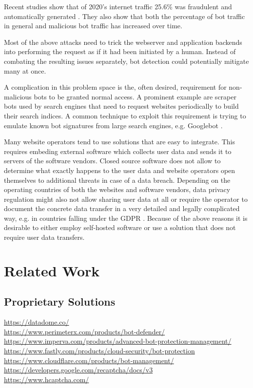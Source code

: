 \documentclass[
    fontsize=12pt,
    headings=small,
    parskip=half,           %
    bibliography=totoc,
    numbers=noenddot,       %
    open=any,               %
    final                   %
    ]{scrreprt}
\begin{document}
Recent studies show that of 2020's internet traffic 25.6\% was fraudulent and automatically generated \cite{BAD_BOT_REPORT2020} \cite{BAD_BOT_REPORT2021}. They also show that both the percentage of bot traffic in general and malicious bot traffic has increased over time.

Most of the above attacks need to trick the webserver and application backends into performing the request as if it had been initiated by a human. Instead of combating the resulting issues separately, bot detection could potentially mitigate many at once.

A complication in this problem space is the, often desired, requirement for non-malicious bots to be granted normal access. A prominent example are scraper bots used by search engines that need to request websites periodically to build their search indices. A common technique to exploit this requirement is trying to emulate known bot signatures from large search engines, e.g. Googlebot \cite{8421894}.

Many website operators tend to use solutions that are easy to integrate. This requires embeding external software which collects user data and sends it to servers of the software vendors. Closed source software does not allow to determine what exactly happens to the user data and website operators open themselves to additional threats in case of a data breach. Depending on the operating countries of both the websites and software vendors, data privacy regulation might also not allow sharing user data at all or require the operator to document the concrete data transfer in a very detailed and legally complicated way, e.g. in countries falling under the GDPR \cite{GDPR}. Because of the above reasons it is desirable to either employ self-hosted software or use a solution that does not require user data transfers.



\chapter{Related Work}

\section{Proprietary Solutions}

\url{https://datadome.co/} \\
\url{https://www.perimeterx.com/products/bot-defender/} \\
\url{https://www.imperva.com/products/advanced-bot-protection-management/} \\
\url{https://www.fastly.com/products/cloud-security/bot-protection} \\
\url{https://www.cloudflare.com/products/bot-management/} \\
\url{https://developers.google.com/recaptcha/docs/v3} \\
\url{https://www.hcaptcha.com/} \\
\end{document}
